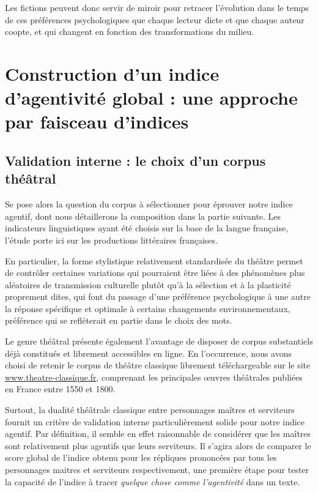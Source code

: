 Les fictions peuvent donc servir de miroir pour retracer l'évolution dans le temps de ces préférences psychologiques que chaque lecteur dicte et que chaque auteur coopte, et qui changent en fonction des transformations du milieu.

\chapter{Construction d’un indice d’agentivité global : une approche par faisceau d’indices}

\section{Validation interne : le choix d’un corpus théâtral}

Se pose alors la question du corpus à sélectionner pour éprouver notre indice agentif, dont nous détaillerons la composition dans la partie suivante. Les indicateurs linguistiques ayant été choisis sur la base de la langue française, l'étude porte ici sur les productions littéraires françaises.

En particulier, la forme stylistique relativement standardisée du théâtre permet de contrôler certaines variations qui pourraient être liées à des phénomènes plus aléatoires de transmission culturelle plutôt qu'à la sélection et à la plasticité proprement dites, qui font du passage d'une préférence psychologique à une autre la réponse spécifique et optimale à certains changements environnementaux, préférence qui se refléterait en partie dans le choix des mots.

Le genre théâtral présente également l'avantage de disposer de corpus substantiels déjà constitués et librement accessibles en ligne. En l'occurrence, nous avons choisi de retenir le corpus de théâtre classique librement téléchargeable sur le site \small{\url{www.theatre-classique.fr}}, comprenant les principales œuvres théâtrales publiées en France entre 1550 et 1800.

Surtout, la dualité théâtrale classique entre personnages maîtres et serviteurs fournit un critère de validation interne particulièrement solide pour notre indice agentif. Par définition, il semble en effet raisonnable de considérer que les maîtres sont relativement plus agentifs que leurs serviteurs. Il s’agira alors de comparer le score global de l'indice obtenu pour les répliques prononcées par tous les personnages maitres et serviteurs respectivement, une première étape pour tester la capacité de l’indice à tracer \textit{quelque chose comme l'agentivité} dans un texte.

